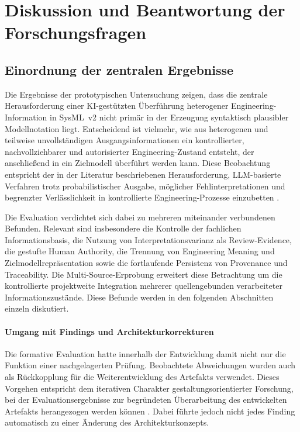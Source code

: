 
\section{Diskussion und Beantwortung der Forschungsfragen}
\label{sec:discussion}

\subsection{Einordnung der zentralen Ergebnisse}
\label{sec:discussion_overview}

Die Ergebnisse der prototypischen Untersuchung zeigen, dass die zentrale
Herausforderung einer KI-gestützten Überführung heterogener
Engineering-Information in SysML~v2 nicht primär in der Erzeugung syntaktisch
plausibler Modellnotation liegt. Entscheidend ist vielmehr, wie aus
heterogenen und teilweise unvollständigen Ausgangsinformationen ein
kontrollierter, nachvollziehbarer und autorisierter Engineering-Zustand
entsteht, der anschließend in ein Zielmodell überführt werden kann. Diese
Beobachtung entspricht der in der Literatur beschriebenen Herausforderung,
LLM-basierte Verfahren trotz probabilistischer Ausgabe, möglicher
Fehlinterpretationen und begrenzter Verlässlichkeit in kontrollierte
Engineering-Prozesse einzubetten \cite{Topcu2025,Barke2023,Sergeyuk2025}.

Die Evaluation verdichtet sich dabei zu mehreren miteinander verbundenen
Befunden. Relevant sind insbesondere die Kontrolle der fachlichen
Informationsbasis, die Nutzung von Interpretationsvarianz als Review-Evidence,
die gestufte Human Authority, die Trennung von Engineering Meaning und
Zielmodellrepräsentation sowie die fortlaufende Persistenz von Provenance und
Traceability. Die Multi-Source-Erprobung erweitert diese Betrachtung um die
kontrollierte projektweite Integration mehrerer quellengebunden verarbeiteter
Informationszustände. Diese Befunde werden in den folgenden Abschnitten
einzeln diskutiert.

\paragraph{Umgang mit Findings und Architekturkorrekturen}

Die formative Evaluation hatte innerhalb der Entwicklung damit nicht nur die
Funktion einer nachgelagerten Prüfung. Beobachtete Abweichungen wurden auch als
Rückkopplung für die Weiterentwicklung des Artefakts verwendet. Dieses Vorgehen
entspricht dem iterativen Charakter gestaltungsorientierter Forschung, bei der
Evaluationsergebnisse zur begründeten Überarbeitung des entwickelten Artefakts
herangezogen werden können \cite{Wieringa2014}. Dabei führte jedoch nicht jedes
Finding automatisch zu einer Änderung des Architekturkonzepts.

